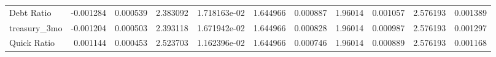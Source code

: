 \documentclass[12pt,a4paper,english]{article}
\begin{document}
{{\begin{tabular}{@{}lrrrrrrrrrr@{}}
			Debt Ratio                     & -0.001284                & 0.000539                    & 2.383092                  & 1.718163e-02                             & 1.644966                      & 0.000887                      & 1.96014                      & 0.001057                     & 2.576193                     & 0.001389                     \\
			treasury\_3mo                  & -0.001204                & 0.000503                    & 2.393118                  & 1.671942e-02                             & 1.644966                      & 0.000828                      & 1.96014                      & 0.000987                     & 2.576193                     & 0.001297                     \\
			Quick Ratio                    & 0.001144                 & 0.000453                    & 2.523703                  & 1.162396e-02                             & 1.644966                      & 0.000746                      & 1.96014                      & 0.000889                     & 2.576193                     & 0.001168                     \\ \bottomrule
		\end{tabular}%
	}
}
\end{document}

